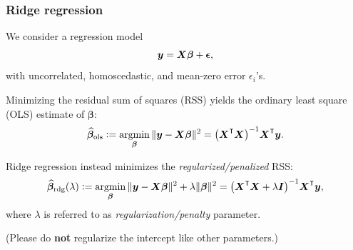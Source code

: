 \documentclass[18pt]{beamer}
\newcommand{\defineTightSpacing}{%
	\setlength{\abovedisplayskip}{.25\baselineskip}%
	\setlength{\belowdisplayskip}{.25\baselineskip}%
}
\renewcommand{\textsc}[1]{{\small \MakeUppercase{#1}}}
\newcommand{\defeq}{\vcentcolon =} %
\DeclareMathOperator*{\argmin}{argmin}
\newcommand{\transpose}{\text{\raisebox{.5ex}{$\intercal$}}}
\newcommand{\by}{\bm{y}}
\newcommand{\bX}{\bm{X}}
\newcommand{\bbeta}{\bm{\beta}}
\newcommand{\Id}{\bm{I}}
\begin{document}
\newcommand{\penaltyParam}{\lambda}
\begin{frame}
\frametitle{Ridge regression}
\vspace*{-.2\baselineskip}
We consider a regression model
\begin{equation*} \defineTightSpacing%
\by = \bX \bbeta + \bm{\epsilon},
\end{equation*}
with uncorrelated, homoscedastic, and mean-zero error $\epsilon_i$'s.

\pause
\smallskip
Minimizing the residual sum of squares (\textsc{RSS}) yields the ordinary least square (\textsc{OLS}) estimate of $\bbeta$:
\begin{equation*} \defineTightSpacing%
\widehat{\bbeta}_{\mathrm{ols}} 
	\defeq \argmin_{\bbeta} \| \by - \bX \bbeta \|^2
	= \left( \bX^\transpose \bX \right)^{-1} \! \bX^\transpose \by.
\end{equation*}

\pause
Ridge regression instead minimizes the \textit{regularized/penalized} \textsc{RSS}:
\begin{equation*} \defineTightSpacing%
\widehat{\bbeta}_{\mathrm{rdg}}(\penaltyParam)
	\defeq \argmin_{\bbeta} \| \by - \bX \bbeta \|^2 + \penaltyParam \| \bbeta \|^2
	= \left( \bX^\transpose \bX + \lambda \Id \right)^{-1} \! \bX^\transpose \by,
\end{equation*}
where $\penaltyParam$ is referred to as \textit{regularization/penalty} parameter.

\pause
(Please do \textbf{not} regularize the intercept like other parameters.)
\end{frame}
\end{document}
